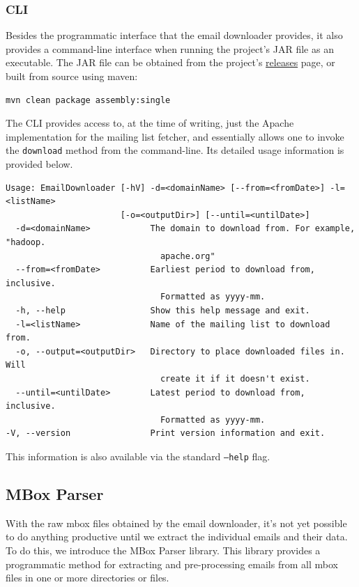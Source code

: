 \documentclass[a4paper, 12pt]{article}
\begin{document}
		\subsubsection{CLI}
			Besides the programmatic interface that the email downloader provides, it also provides a command-line interface when running the project's JAR file as an executable. The JAR file can be obtained from the project's \href{https://github.com/ArchitecturalKnowledgeAnalysis/EmailDownloader/releases}{releases} page, or built from source using maven:
			
			\begin{verbatim}
mvn clean package assembly:single
			\end{verbatim}
		
			The CLI provides access to, at the time of writing, just the Apache implementation for the mailing list fetcher, and essentially allows one to invoke the \texttt{download} method from the command-line. Its detailed usage information is provided below.
			
			\begin{verbatim}
Usage: EmailDownloader [-hV] -d=<domainName> [--from=<fromDate>] -l=<listName>
                       [-o=<outputDir>] [--until=<untilDate>]
  -d=<domainName>            The domain to download from. For example, "hadoop.
                               apache.org"
  --from=<fromDate>          Earliest period to download from, inclusive.
                               Formatted as yyyy-mm.
  -h, --help                 Show this help message and exit.
  -l=<listName>              Name of the mailing list to download from.
  -o, --output=<outputDir>   Directory to place downloaded files in. Will
                               create it if it doesn't exist.
  --until=<untilDate>        Latest period to download from, inclusive.
                               Formatted as yyyy-mm.
-V, --version                Print version information and exit.
			\end{verbatim}
		
			This information is also available via the standard \texttt{--help} flag.
	
	\newpage
	\subsection{MBox Parser}
		\label{sec:mbox-parser}
		With the raw mbox files obtained by the email downloader, it's not yet possible to do anything productive until we extract the individual emails and their data. To do this, we introduce the MBox Parser library. This library provides a programmatic method for extracting and pre-processing emails from all mbox files in one or more directories or files.
		
\end{document}
